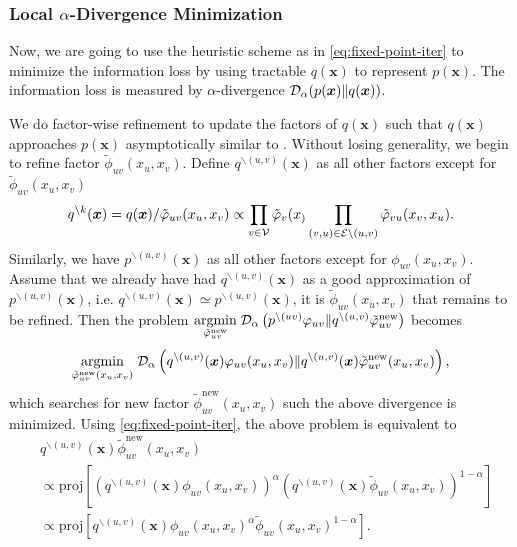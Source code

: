 \documentclass[conference,onecolumn]{IEEEtran}
\begin{document}
\subsubsection{Local $\alpha$-Divergence Minimization}

Now, we are going to use the heuristic scheme as in \autoref{eq:fixed-point-iter} to minimize the information loss by using tractable $q(\bm{x})$ to represent $p(\bm{x})$. The information loss is measured by $\alpha$-divergence $\mathcal{D}_{\alpha}(p(\bm{x}) \| q(\bm{x}))$.

We do factor-wise refinement to update the factors of $q(\bm{x})$ such that $q(\bm{x})$ approaches $p(\bm{x})$ asymptotically similar to \cite{divergence-measures-and-message-passing,Minka:2001:EPA:647235.720257}. Without losing generality, we begin to refine factor $\tilde{\phi}_{uv}(x_u, x_v)$. Define $q^{\backslash (u,v)}(\bm{x})$ as all other factors except for $\tilde{\phi}_{uv}(x_u, x_v)$
\begin{equation}
  q^{\backslash k}(\bm{x}) = q(\bm{x})/\tilde{\varphi}_{uv}(x_u, x_v)
  \propto \prod_{{v\in \mathcal{V}}} \tilde{\varphi}_v(x_) \prod_{(v,u) \in
    \mathcal{E}\backslash (u,v)} \tilde{\varphi}_{vu}(x_v, x_u).
\end{equation}
Similarly, we have $p^{\backslash (u,v)}(\bm{x})$ as all other factors except for ${\phi}_{uv}(x_u, x_v)$. Assume that we already have had $q^{\backslash (u,v)}(\bm{x})$ as a good approximation of $p^{\backslash (u,v)}(\bm{x})$, i.e. $q^{\backslash (u,v)}(\bm{x}) \simeq p^{\backslash (u,v)}(\bm{x})$, it is $\tilde{\phi}_{uv}(x_u, x_v)$ that remains to be refined. 
Then the problem $\underset{\tilde{\varphi}_{uv}^{\mathrm{new}}}{\operatorname{argmin}}\; \mathcal{D}_{\alpha}\left(  p^{\backslash (uv)}\varphi_{uv}\|q^{\backslash (u,v)}\tilde{\varphi}_{uv}^{\mathrm{new}}\right)$ becomes \vspace{-0.3cm}
\begin{equation}
  \underset{\tilde{\varphi}_{uv}^{\mathrm{new}}(x_u, x_v)}{\operatorname{argmin}}\;
  \mathcal{D}_{\alpha}\left( q^{\backslash (u,v)}(\bm{x}){\varphi}_{uv}(x_u, x_v)
    \|q^{\backslash (u,v)}(\bm{x})\tilde{\varphi}_{uv}^{\mathrm{new}}(x_u, x_v) \right),
\end{equation}
which searches for new factor $\tilde{\phi}_{uv}^{\mathrm{new}}(x_u, x_v)$ such the above divergence is minimized.
Using \autoref{eq:fixed-point-iter}, the above problem is equivalent to
\begin{align}\label{eq:update-rule}
  &q^{\backslash (u,v)}(\bm{x})\tilde{\phi}_{uv}^{\mathrm{new}}(x_u, x_v)  \nonumber\\
  &\propto \text{proj}\left[ \left( q^{\backslash (u,v)}(\bm{x}){\phi}_{uv}(x_u, x_v) \right)^{\alpha} \left(q^{\backslash (u,v)}(\bm{x})\tilde{\phi}_{uv}(x_u, x_v)  \right)^{1-\alpha} \right] \nonumber \\
  & \propto \text{proj}\left[ q^{\backslash
    (u,v)}(\bm{x}){\phi}_{uv}(x_u, x_v)^{\alpha} \tilde{\phi}_{uv}(x_u, x_v)^{1-\alpha} \right].
\end{align}
\end{document}
